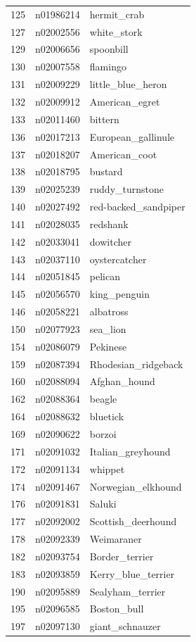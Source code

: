 \begin{table}
\begin{tabular}{cll}
125 & n01986214 & hermit_crab \\
127 & n02002556 & white_stork \\
129 & n02006656 & spoonbill \\
130 & n02007558 & flamingo \\
131 & n02009229 & little_blue_heron \\
132 & n02009912 & American_egret \\
133 & n02011460 & bittern \\
136 & n02017213 & European_gallinule \\
137 & n02018207 & American_coot \\
138 & n02018795 & bustard \\
139 & n02025239 & ruddy_turnstone \\
140 & n02027492 & red-backed_sandpiper \\
141 & n02028035 & redshank \\
142 & n02033041 & dowitcher \\
143 & n02037110 & oystercatcher \\
144 & n02051845 & pelican \\
145 & n02056570 & king_penguin \\
146 & n02058221 & albatross \\
150 & n02077923 & sea_lion \\
154 & n02086079 & Pekinese \\
159 & n02087394 & Rhodesian_ridgeback \\
160 & n02088094 & Afghan_hound \\
162 & n02088364 & beagle \\
164 & n02088632 & bluetick \\
169 & n02090622 & borzoi \\
171 & n02091032 & Italian_greyhound \\
172 & n02091134 & whippet \\
174 & n02091467 & Norwegian_elkhound \\
176 & n02091831 & Saluki \\
177 & n02092002 & Scottish_deerhound \\
178 & n02092339 & Weimaraner \\
182 & n02093754 & Border_terrier \\
183 & n02093859 & Kerry_blue_terrier \\
190 & n02095889 & Sealyham_terrier \\
195 & n02096585 & Boston_bull \\
197 & n02097130 & giant_schnauzer \\

\end{tabular}
\end{table}
